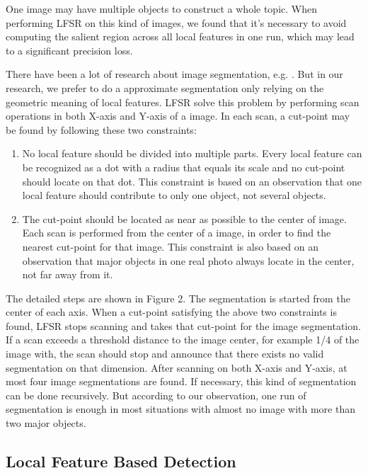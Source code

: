 One image may have multiple objects to construct a whole topic. When performing LFSR on this kind of images, we found that it's necessary to avoid computing the salient region across all local features in one run, which may lead to a significant precision loss.

There have been a lot of research about image segmentation, e.g. . But in our research, we prefer to do a approximate segmentation only relying on the geometric meaning of local features. LFSR solve this problem by performing scan operations in both X-axis and Y-axis of a image. In each scan, a cut-point may be found by following these two constraints:

\begin{enumerate}

  \item No local feature should be divided into multiple parts. Every local feature can be recognized as a dot with a radius that equals its scale and no cut-point should locate on that dot. This constraint is based on an observation that one local feature should contribute to only one object, not several objects.

  \item The cut-point should be located as near as possible to the center of image. Each scan is performed from the center of a image, in order to find the nearest cut-point for that image. This constraint is also based on an observation that major objects in one real photo always locate in the center, not far away from it.

\end{enumerate}

The detailed steps are shown in Figure 2. The segmentation is started from the center of each axis. When a cut-point satisfying the above two constraints is found, LFSR stops scanning and takes that cut-point for the image segmentation. If a scan exceeds a threshold distance to the image center, for example 1/4 of the image with, the scan should stop and announce that there exists no valid segmentation on that dimension. After scanning on both X-axis and Y-axis, at most four image segmentations are found. If necessary, this kind of segmentation can be done recursively. But according to our observation, one run of segmentation is enough in most situations with almost no image with more than two major objects.

\subsection{Local Feature Based Detection}
\label{sec:algorithm_detection}

